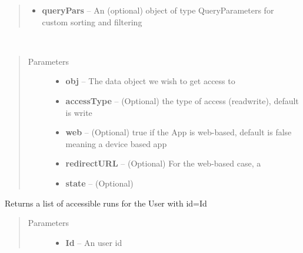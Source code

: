\documentclass[letterpaper,10pt,english]{sphinxmanual}
\begin{document}
\begin{fulllineitems}
\begin{fulllineitems}
\begin{quote}
\begin{description}
\begin{itemize}
\item {} 
\textbf{queryPars} -- An (optional) object of type QueryParameters for custom sorting and filtering

\end{itemize}

\end{description}\end{quote}

\end{fulllineitems}


\begin{fulllineitems}
\label{Available modules:BaseSpacePy.api.BaseSpaceAPI.BaseSpaceAPI.getAccess}~\begin{quote}\begin{description}
\item[{Parameters}] \leavevmode\begin{itemize}
\item {} 
\textbf{obj} -- The data object we wish to get access to

\item {} 
\textbf{accessType} -- (Optional) the type of access (read\textbar{}write), default is write

\item {} 
\textbf{web} -- (Optional) true if the App is web-based, default is false meaning a device based app

\item {} 
\textbf{redirectURL} -- (Optional) For the web-based case, a

\item {} 
\textbf{state} -- (Optional)

\end{itemize}

\end{description}\end{quote}

\end{fulllineitems}


\begin{fulllineitems}
\label{Available modules:BaseSpacePy.api.BaseSpaceAPI.BaseSpaceAPI.getAccessibleRunsByUser}
Returns a list of accessible runs for the User with id=Id
\begin{quote}\begin{description}
\item[{Parameters}] \leavevmode\begin{itemize}
\item {} 
\textbf{Id} -- An user id


\end{itemize}
\end{description}
\end{quote}
\end{fulllineitems}
\end{fulllineitems}
\end{document}

